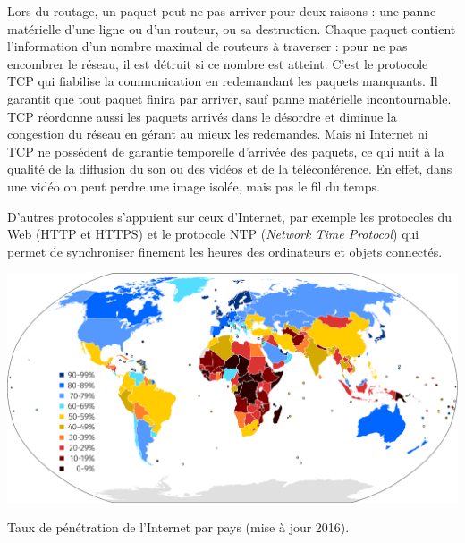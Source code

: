 \begin{tcolorbox}[title={Algorithmes et programmes}, toprule=0pt, leftrule=0pt, rightrule=0pt, arc=0pt,
                  fonttitle=\scshape\boxtitlefont,
                  colbacktitle=white, coltitle=firstcolor, colframe=firstcolor, colback=firstcolor!10,
                  breakable, enhanced jigsaw]
Lors du routage, un paquet peut ne pas arriver pour deux raisons : une panne matérielle d’une ligne ou d’un routeur, ou sa destruction. Chaque paquet contient l’information d’un nombre maximal de routeurs à traverser : pour ne pas encombrer le réseau, il est détruit si ce nombre est atteint. C’est le protocole TCP qui fiabilise la communication en redemandant les paquets manquants. Il garantit que tout paquet finira par arriver, sauf panne matérielle incontournable. TCP réordonne aussi les paquets arrivés dans le désordre et diminue la congestion du réseau en gérant au mieux les redemandes. Mais ni Internet ni TCP ne possèdent de garantie temporelle d’arrivée des paquets, ce qui nuit à la qualité de la diffusion du son ou des vidéos et de la téléconférence. En effet, dans une vidéo on peut perdre une image isolée, mais pas le fil du temps.

D’autres protocoles s’appuient sur ceux d’Internet, par exemple les protocoles du Web (HTTP et HTTPS) et le protocole NTP (\textit{Network Time Protocol}) qui permet de synchroniser finement les heures des ordinateurs et objets connectés.
\end{tcolorbox}

\begin{jazzfigure*}
\Centering
\includegraphics[width=\linewidth]{./Images/Chapter09/figIX-01-internet-penetration-map-2016-update.pdf}
\caption{\label{fig:IX.2}Taux de pénétration de l'Internet par pays (mise à jour 2016).}
\end{jazzfigure*}
\vspace*{-16pt}


